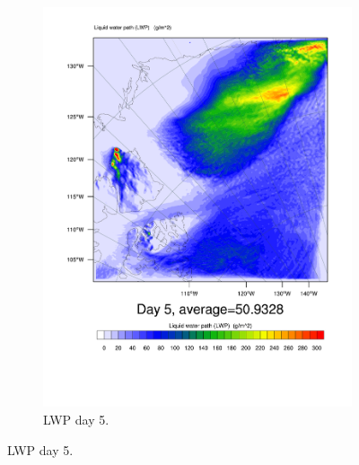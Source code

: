 \begin{figure}
\begin{subfigure}{0.40\textwidth}
        \includegraphics[width=\textwidth]{results/control/LWP_Day5.pdf}
        \caption{LWP day 5.}
        \label{subfig:LWPr1Day5}
    \end{subfigure}


\end{figure}
